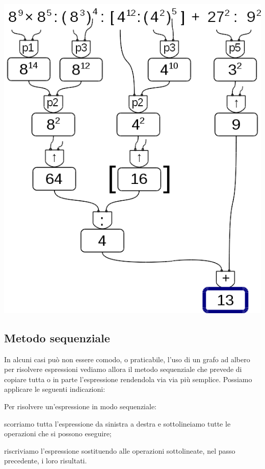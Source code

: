 \begin{exrig}
\begin{esempio}
\begin{inaccessibleblock}[]
 \begin{center}
  \includegraphics[scale=0.35]{img/op_espr_pot.png}
 \end{center}
\end{inaccessibleblock}
 \end{esempio}
\end{exrig}

\subsection{Metodo sequenziale}

In alcuni casi può non essere comodo, o praticabile, l'uso di un grafo ad 
albero per risolvere espressioni vediamo allora il metodo sequenziale che
prevede di copiare tutta o in parte l'espressione rendendola via via più 
semplice. Possiamo applicare le seguenti indicazioni:

\begin{procedura}
 Per risolvere un'espressione in modo sequenziale:
\begin{enumerate*}
 \item scorriamo tutta l'espressione da sinistra a destra 
 e sottolineiamo tutte le operazioni che si possono eseguire;
 \item riscriviamo l'espressione sostituendo alle operazioni sottolineate,
 nel passo precedente, i loro risultati.
\end{enumerate*}
\end{procedura}

